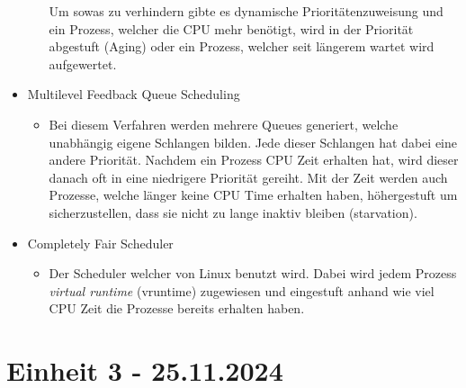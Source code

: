 \documentclass{article}
\begin{document}
\begin{itemize}
\begin{itemize}
{			Um sowas zu verhindern gibte es dynamische Prioritätenzuweisung und ein Prozess, welcher die CPU mehr benötigt, wird in der Priorität abgestuft (Aging) oder ein Prozess, welcher seit längerem wartet wird aufgewertet.}
		\end{itemize}
		\item{Multilevel Feedback Queue Scheduling}
		\begin{itemize}
			\item{Bei diesem Verfahren werden mehrere Queues generiert, welche unabhängig eigene Schlangen bilden. Jede dieser Schlangen hat dabei eine andere Priorität. Nachdem ein Prozess CPU Zeit erhalten hat, wird dieser danach oft in eine niedrigere Priorität gereiht. Mit der Zeit werden auch Prozesse, welche länger keine CPU Time erhalten haben, höhergestuft um sicherzustellen, dass sie nicht zu lange inaktiv bleiben (starvation).}
		\end{itemize}
		\item{Completely Fair Scheduler}
		\begin{itemize}
			\item{Der Scheduler welcher von Linux benutzt wird. Dabei wird jedem Prozess \textit{virtual runtime} (vruntime) zugewiesen und eingestuft anhand wie viel CPU Zeit die Prozesse bereits erhalten haben.}
		\end{itemize}
	\end{itemize}
	 \section{Einheit 3 - 25.11.2024}
\end{document}
